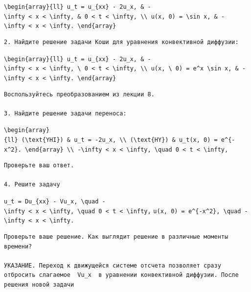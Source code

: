 \documentclass[
  ukrainian,
]{article}
\begin{document}
\texttt{\textbackslash{}begin\{array\}\{ll\}\ u\_t\ =\ u\_\{xx\}\ -\ 2u\_x,\ \&\ -\textbackslash{}infty\ \textless{}\ x\ \textless{}\ \textbackslash{}infty,\ \&\ 0\ \textless{}\ t\ \textless{}\ \textbackslash{}infty,\ \textbackslash{}\textbackslash{}\ u(x,\ 0)\ =\ \textbackslash{}sin\ x,\ \&\ -\textbackslash{}infty\ \textless{}\ x\ \textless{}\ \textbackslash{}infty.\ \textbackslash{}end\{array\}}

\begin{verbatim}
2. Найдите решение задачи Коши для уравнения конвективной диффузии:
\end{verbatim}

\texttt{\textbackslash{}begin\{array\}\{ll\}\ u\_t\ =\ u\_\{xx\}\ -\ 2u\_x,\ \&\ -\textbackslash{}infty\ \textless{}\ x\ \textless{}\ \textbackslash{}infty,\ \textbackslash{}\ 0\ \textless{}\ t\ \textless{}\ \textbackslash{}infty,\ \textbackslash{}\textbackslash{}\ u(x,\ \textbackslash{}\ 0)\ =\ e\^{}x\ \textbackslash{}sin\ x,\ \&\ -\textbackslash{}infty\ \textless{}\ x\ \textless{}\ \textbackslash{}infty.\ \textbackslash{}end\{array\}}

\begin{verbatim}
Воспользуйтесь преобразованием из лекции 8.

3. Найдите решение задачи переноса:
\end{verbatim}

\texttt{\textbackslash{}begin\{array\}\{ll\}\ (\textbackslash{}text\{YHI\})\ \&\ u\_t\ =\ -2u\_x,\ \textbackslash{}\textbackslash{}\ (\textbackslash{}text\{HY\})\ \&\ u\_t(x,\ 0)\ =\ e\^{}\{-x\^{}2\}.\ \textbackslash{}end\{array\}\ \textbackslash{}\textbackslash{}\ -\textbackslash{}infty\ \textless{}\ x\ \textless{}\ \textbackslash{}infty,\ \textbackslash{}quad\ 0\ \textless{}\ t\ \textless{}\ \textbackslash{}infty,}

\begin{verbatim}
Проверьте ваш ответ.

4. Решите задачу
\end{verbatim}

\texttt{u\_t\ =\ Du\_\{xx\}\ -\ Vu\_x,\ \textbackslash{}quad\ -\textbackslash{}infty\ \textless{}\ x\ \textless{}\ \textbackslash{}infty,\ \textbackslash{}quad\ 0\ \textless{}\ t\ \textless{}\ \textbackslash{}infty,}
\texttt{u(x,\ 0)\ =\ e\^{}\{-x\^{}2\},\ \textbackslash{}quad\ -\textbackslash{}infty\ \textless{}\ x\ \textless{}\ \textbackslash{}infty.}

\begin{verbatim}
Проверьте ваше решение. Как выглядит решение в различные моменты времени?

УКАЗАНИЕ. Переход к движущейся системе отсчета позволяет сразу отбросить слагаемое  Vu_x  в уравнении конвективной диффузии. После решения новой задачи
\end{verbatim}
\end{document}

